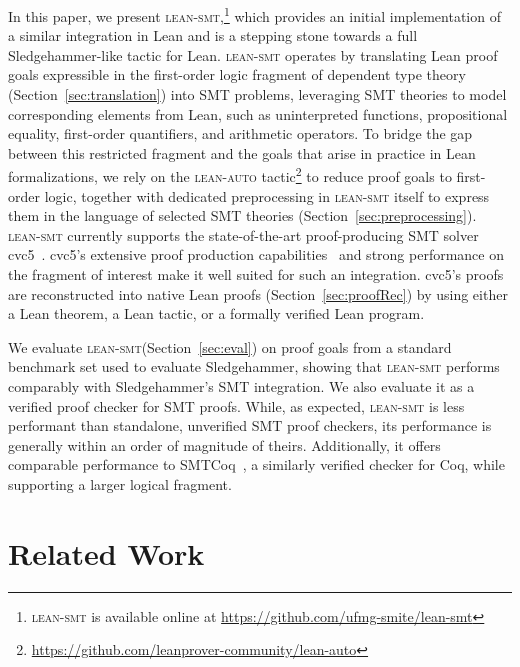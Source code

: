 \documentclass[runningheads]{llncs}
\newcommand{\tactic}{\textsc{lean-smt}\xspace}
\newcommand{\auto}{\textsc{lean-auto}\xspace}
\begin{document}
In this paper, we present \tactic,\footnote{\tactic is available online
  at \url{https://github.com/ufmg-smite/lean-smt}} which provides an initial
implementation of a similar integration in Lean and is a stepping stone towards a full
Sledgehammer-like tactic for Lean.
%
\tactic operates by translating Lean proof goals expressible in the first-order
logic fragment of dependent type theory (Section~\ref{sec:translation}) into SMT problems,
leveraging SMT theories to model corresponding elements from Lean, such as
uninterpreted functions, propositional equality, first-order quantifiers,
and arithmetic operators.
%
To bridge the gap between this restricted fragment and the goals that arise in
practice in Lean formalizations, we rely on the
\auto tactic\footnote{\url{https://github.com/leanprover-community/lean-auto}}
to reduce proof goals to first-order logic, together with dedicated preprocessing in
\tactic itself to express them in the language of selected SMT theories (Section~\ref{sec:preprocessing}).
%
\tactic currently supports the state-of-the-art proof-producing SMT solver
cvc5~\cite{Barbosa2022-cvc5}.
%
cvc5's extensive proof production capabilities~\cite{Barbosa2022} and
strong performance on the fragment of interest make it well suited
for such an integration.
%
cvc5's proofs are reconstructed into native Lean proofs
(Section~\ref{sec:proofRec}) by using either a
Lean theorem, a Lean tactic, or a formally verified Lean program.

We evaluate \tactic (Section~\ref{sec:eval}) on proof goals from a standard
benchmark set used to evaluate Sledgehammer, showing that \tactic performs
comparably with Sledgehammer's SMT integration.
%
We also evaluate it as a verified proof checker for SMT proofs. While, as expected, \tactic is less performant than standalone, unverified SMT proof checkers, its performance is generally within an order of magnitude of theirs. Additionally, it offers comparable performance to SMTCoq~\cite{smtcoq}, a similarly verified checker for Coq, while supporting a larger logical fragment.

\section{Related Work}
\end{document}
